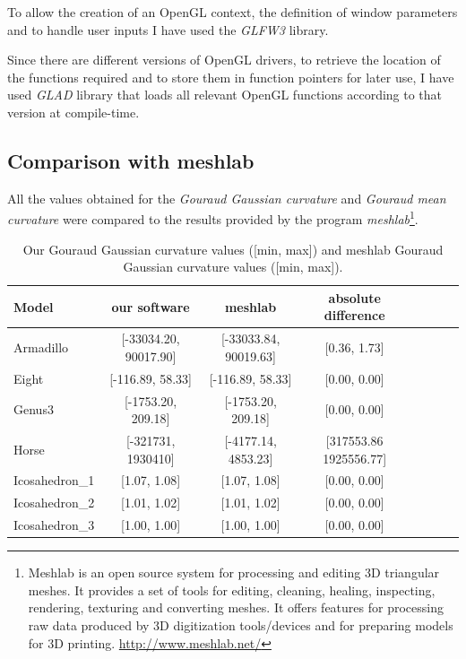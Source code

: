 To allow the creation of an OpenGL context, the definition of window parameters and to handle user inputs I have used the \textit{GLFW3} library.

Since there are different versions of OpenGL drivers, to retrieve the location of the functions required and to store them in function pointers for later use, I have used \textit{GLAD} library that loads all relevant OpenGL functions according to that version at compile-time.

\subsection{Comparison with meshlab}
All the values obtained for the \textit{Gouraud Gaussian curvature} and \textit{Gouraud mean curvature} were compared to the results provided by the program \textit{meshlab}\footnote{Meshlab is an open source system for processing and editing 3D triangular meshes.
It provides a set of tools for editing, cleaning, healing, inspecting, rendering, texturing and converting meshes. It offers features for processing raw data produced by 3D digitization tools/devices and for preparing models for 3D printing. \url{http://www.meshlab.net/}}.


\begin{table}[!h]%
    \centering
\begin{tabular}{l*{6}{c}r}
    \centering
    Model              & our software &  meshlab   & absolute difference\\
    \hline
    Armadillo          & [-33034.20, 90017.90] & [-33033.84, 90019.63] & [0.36, 1.73] \\
    Eight              & [-116.89, 58.33] & [-116.89, 58.33] & [0.00, 0.00] \\
    Genus3             & [-1753.20, 209.18] & [-1753.20, 209.18] & [0.00, 0.00]  \\
    Horse              & [-321731, 1930410] &  [-4177.14, 4853.23] & [317553.86 1925556.77]\\
    Icosahedron\_1      &  [1.07, 1.08] & [1.07, 1.08] & [0.00, 0.00] \\
    Icosahedron\_2      &  [1.01, 1.02] & [1.01, 1.02] & [0.00, 0.00] \\
    Icosahedron\_3      & [1.00, 1.00] &  [1.00, 1.00] & [0.00, 0.00]
\end{tabular}
\caption{Our Gouraud Gaussian curvature values ([min, max]) and meshlab Gouraud Gaussian curvature values ([min, max]).}
\label{table:table-gaussian-meshlab}
\end{table}



